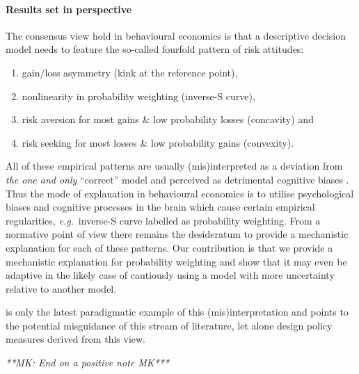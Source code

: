 \documentclass[a4paper, 12pt]{article}
\newcommand{\eg}{{\it e.g.}\ }
\newcommand{\MK}[1]{{\it ***MK: #1 MK***}}
\begin{document}
\paragraph{Results set in perspective}
The consensus view hold in behavioural economics is that a descriptive decision model needs to feature 
the so-called fourfold pattern of risk attitudes:
\begin{enumerate}
	\item gain/loss asymmetry (kink at the reference point),
	\item nonlinearity in probability weighting (inverse-S curve),
	\item risk aversion for most gains \& low probability losses (concavity) and
	\item risk seeking for most losses \& low probability gains (convexity).
\end{enumerate}
All of these empirical patterns are usually (mis)interpreted as a deviation from \textit{the one and only} ``correct'' model and perceived as detrimental cognitive biases \citep{Lopes1991,Gigerenzer2018}. 
% 
Thus the mode of explanation in behavioural economics is to utilise psychological biases and cognitive processes in the brain which cause certain empirical regularities, \eg inverse-S curve labelled as probability weighting.
%
From a normative point of view there remains the desideratum to provide a mechanistic explanation for each of these patterns. Our contribution is that we provide a mechanistic explanation for probability weighting and show that it may even be adaptive in the likely case of cautiously using a model with more uncertainty relative to another model.

\citet{Sunstein2020} is only the latest paradigmatic example of this (mis)interpretation and points to the potential misguidance of this stream of literature, let alone design policy measures derived from this view.

\MK{End on a positive note}


\end{document}
